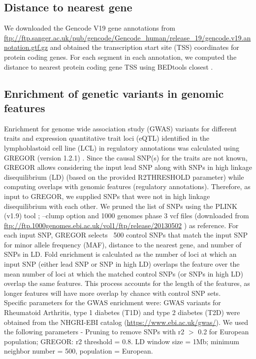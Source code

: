 \subsection{Distance to nearest gene}
We downloaded the Gencode V19 gene annotations from \url{ftp://ftp.sanger.ac.uk/pub/gencode/Gencode_human/release_19/gencode.v19.annotation.gtf.gz} and obtained the transcription start site (TSS) coordinates for protein coding genes. For each segment in each annotation, we computed the distance to nearest protein coding gene TSS using BEDtools closest \cite{quinlanBEDToolsFlexibleSuite2010}.

\subsection{Enrichment of genetic variants in genomic features}
Enrichment for genome wide association study (GWAS) variants for different traits and expression quantitative trait loci (eQTL) identified in the lymphoblastoid cell line (LCL) in regulatory annotations was calculated using GREGOR (version 1.2.1) \cite{schmidtGREGOREvaluatingGlobal2015}. Since the causal SNP(s) for the traits are not known, GREGOR allows considering the input lead SNP along with SNPs in high linkage disequilibrium (LD) (based on the provided R2THRESHOLD parameter) while computing overlaps with genomic features (regulatory annotations). Therefore, as input to GREGOR, we supplied SNPs that were not in high linkage disequilibrium with each other. We pruned the list of SNPs using the PLINK (v1.9) tool \cite{purcellPLINKToolSet2007}; \cite{changSecondgenerationPLINKRising2015} –clump option and 1000 genomes phase 3 vcf files (downloaded from \url{ftp://ftp.1000genomes.ebi.ac.uk/vol1/ftp/release/20130502} ) as reference. For each input SNP, GREGOR selects ~500 control SNPs that match the input SNP for minor allele frequency (MAF), distance to the nearest gene, and number of SNPs in LD. Fold enrichment is calculated as the number of loci at which an input SNP (either lead SNP or SNP in high LD) overlaps the feature over the mean number of loci at which the matched control SNPs (or SNPs in high LD) overlap the same features. This process accounts for the length of the features, as longer features will have more overlap by chance with control SNP sets.\\

Specific parameters for the GWAS enrichment were: GWAS variants for Rheumatoid Arthritis, type 1 diabetes (T1D) and type 2 diabetes (T2D) were obtained from the NHGRI-EBI catalog (\url{https://www.ebi.ac.uk/gwas/}). We used the following parameters - Pruning to remove SNPs with r2 $>$ 0.2 for European population; GREGOR: r2 threshold = 0.8. LD window size = 1Mb; minimum neighbor number = 500, population = European.\\

